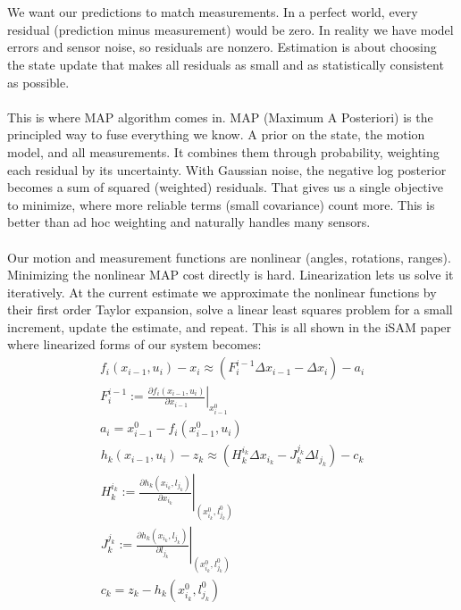 \\ \\
We want our predictions to match measurements. In a perfect world, every residual (prediction minus measurement) would be zero. In reality we have model errors and sensor noise, so residuals are nonzero. Estimation is about choosing the state update that makes all residuals as small and as statistically consistent as possible.
\\ \\
This is where MAP algorithm comes in. MAP (Maximum A Posteriori) is the principled way to fuse everything we know. A prior on the state, the motion model, and all measurements. It combines them through probability, weighting each residual by its uncertainty. With Gaussian noise, the negative log posterior becomes a sum of squared (weighted) residuals. That gives us a single objective to minimize, where more reliable terms (small covariance) count more. This is better than ad hoc weighting and naturally handles many sensors.
\\ \\
Our motion and measurement functions are nonlinear (angles, rotations, ranges). Minimizing the nonlinear MAP cost directly is hard. Linearization lets us solve it iteratively. At the current estimate we approximate the nonlinear functions by their first order Taylor expansion, solve a linear least squares problem for a small increment, update the estimate, and repeat. This is all shown in the iSAM paper \cite{iSAM_paper} where linearized forms of our system becomes:
\begin{equation}
    \begin{aligned}
        f_{i}(x_{i-1}, u_i) - x_i \approx (F_{i}^{i-1}\Delta x_{i-1} - \Delta x_{i}) - a_i \\
        \left.F_{i}^{i-1} := \frac{\partial f_{i}(x_{i-1}, u_i)}{\partial x_{i-1}}\right|_{x_{i-1}^{0}} \\ 
        a_i = x_{i-1}^{0} - f_{i}(x_{i-1}^{0}, u_i)
    \end{aligned}
    \label{eq:optimizer-iSAM-linearized-odometry}
\end{equation}
\begin{equation}
    \begin{aligned}
        h_{k}(x_{i-1}, u_i) - z_k \approx (H_{k}^{i_k}\Delta x_{i_k} - J_{k}^{j_k} \Delta l_{j_k}) - c_k \\
        \left.H_{k}^{i_k} := \frac{\partial h_{k}(x_{i_k}, l_{j_k})}{\partial x_{i_k}}\right|_{(x_{i_k}^{0}, l_{j_k}^{0})} \\ 
        \left.J_{k}^{j_k} := \frac{\partial h_{k}(x_{i_k}, l_{j_k})}{\partial l_{j_k}}\right|_{(x_{i_k}^{0}, l_{j_k}^{0})} \\ 
        c_k = z_{k} - h_{k}(x_{i_k}^{0}, l_{j_k}^{0})
    \end{aligned}
    \label{eq:optimizer-iSAM-linearized-measurement}
\end{equation}
